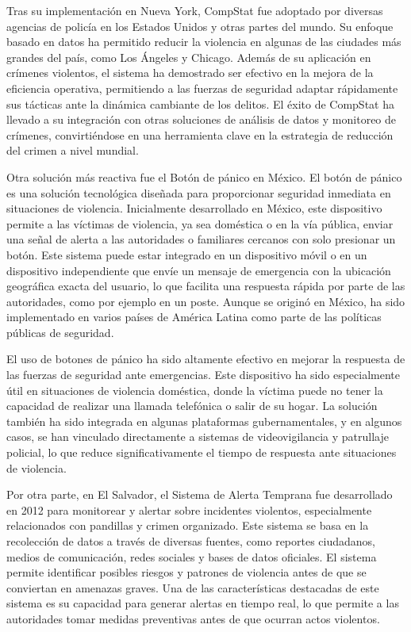 Tras su implementación en Nueva York, CompStat fue adoptado 
por diversas agencias de policía en los Estados Unidos y 
otras partes del mundo\cite{weisburd2003reforming}. Su enfoque basado en datos ha 
permitido reducir la violencia en algunas de las ciudades 
más grandes del país, como Los Ángeles y Chicago. Además 
de su aplicación en crímenes violentos, el sistema ha 
demostrado ser efectivo en la mejora de la eficiencia 
operativa, permitiendo a las fuerzas de seguridad adaptar 
rápidamente sus tácticas ante la dinámica cambiante de 
los delitos. El éxito de CompStat ha llevado a su 
integración con otras soluciones de análisis de datos y 
monitoreo de crímenes, convirtiéndose en una herramienta 
clave en la estrategia de reducción del crimen a nivel 
mundial.

Otra solución más reactiva fue el Botón de pánico en México. 
El botón de pánico es una solución tecnológica diseñada 
para proporcionar seguridad inmediata en situaciones de 
violencia\cite{cdmx2008botonpanico}. Inicialmente desarrollado en México, este 
dispositivo permite a las víctimas de violencia, ya sea 
doméstica o en la vía pública, enviar una señal de alerta 
a las autoridades o familiares cercanos con solo presionar 
un botón. Este sistema puede estar integrado en un 
dispositivo móvil o en un dispositivo independiente que 
envíe un mensaje de emergencia con la ubicación geográfica 
exacta del usuario, lo que facilita una respuesta rápida 
por parte de las autoridades, como por ejemplo en un poste. 
Aunque se originó en México, ha sido implementado en 
varios países de América Latina como parte de las 
políticas públicas de seguridad.

El uso de botones de pánico ha sido altamente efectivo en 
mejorar la respuesta de las fuerzas de seguridad ante 
emergencias. Este dispositivo ha sido especialmente útil 
en situaciones de violencia doméstica, donde la víctima 
puede no tener la capacidad de realizar una llamada 
telefónica o salir de su hogar. La solución también ha 
sido integrada en algunas plataformas gubernamentales, 
y en algunos casos, se han vinculado directamente a 
sistemas de videovigilancia y patrullaje policial, 
lo que reduce significativamente el tiempo de respuesta 
ante situaciones de violencia.

Por otra parte, en El Salvador, el Sistema de Alerta 
Temprana fue desarrollado en 2012 para monitorear y alertar 
sobre incidentes violentos, especialmente relacionados 
con pandillas y crimen organizado. Este sistema se 
basa en la recolección de datos a través de diversas 
fuentes, como reportes ciudadanos, medios de comunicación, 
redes sociales y bases de datos oficiales. El sistema 
permite identificar posibles riesgos y patrones de 
violencia antes de que se conviertan en amenazas graves. 
Una de las características destacadas de este sistema es 
su capacidad para generar alertas en tiempo real, lo que 
permite a las autoridades tomar medidas preventivas antes 
de que ocurran actos violentos\cite{MinisteriodeJusticiaySeguridadPblica2025}.

